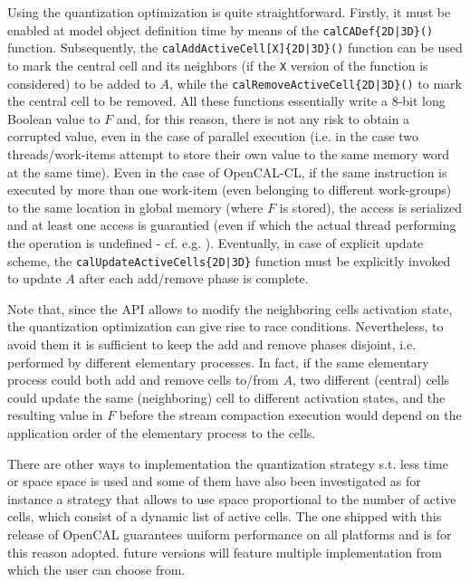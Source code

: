 Using the quantization optimization is quite
straightforward. Firstly, it must be enabled at model object
definition time by means of the \verb'calCADef{2D|3D}()'
function. Subsequently, the \verb'calAddActiveCell[X]{2D|3D}()'
function can be used to mark the central cell and its neighbors (if
the \verb'X' version of the function is considered) to be added to
$A$, while the \verb'calRemoveActiveCell{2D|3D}()' to mark the
central cell to be removed. All these functions essentially write a
8-bit long Boolean value to $F$ and, for this reason, there is not
any risk to obtain a corrupted value, even in the case of parallel
execution (i.e. in the case two threads/work-items attempt to store
their own value to the same memory word at the same time). Even in
the case of OpenCAL-CL, if the same instruction is executed by more
than one work-item (even belonging to different work-groups) to the
same location in global memory (where $F$ is stored), the access is
serialized and at least one access is guarantied (even if which the
actual thread performing the operation is undefined -
cf. e.g. \cite{CUDA}). Eventually, in case of explicit update
scheme, the \verb'calUpdateActiveCells{2D|3D}' function must be
explicitly invoked to update $A$ after each add/remove phase is
complete.

Note that, since the API allows to modify the neighboring cells
activation state, the quantization optimization can give rise to
race conditions. Nevertheless, to avoid them it is sufficient to
keep the add and remove phases disjoint, i.e. performed by different
elementary processes. In fact, if the same elementary process could
both add and remove cells to/from $A$, two different (central) cells
could update the same (neighboring) cell to different activation
states, and the resulting value in $F$ before the stream compaction
execution would depend on the application order of the elementary
process to the cells.

There are other ways to implementation the quantization strategy s.t. less time or space space is used and some of them have also been investigated as for instance a strategy that allows to use space proportional to the number of active cells, which consist of a dynamic list of active cells. The one shipped with this release of OpenCAL guarantees uniform performance on all platforms and is for this reason adopted. future versions will feature multiple implementation from which the user can choose from.



